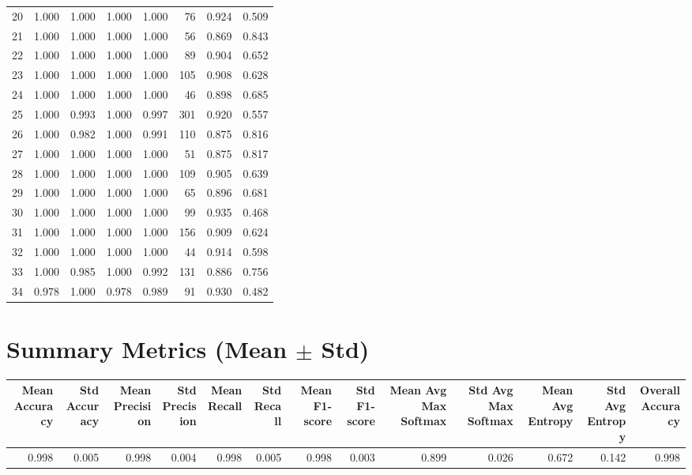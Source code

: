 \documentclass{article}
\begin{document}
\begin{tabular}{lrrrrrrr}
20 & 1.000 & 1.000 & 1.000 & 1.000 & 76 & 0.924 & 0.509 \\
21 & 1.000 & 1.000 & 1.000 & 1.000 & 56 & 0.869 & 0.843 \\
22 & 1.000 & 1.000 & 1.000 & 1.000 & 89 & 0.904 & 0.652 \\
23 & 1.000 & 1.000 & 1.000 & 1.000 & 105 & 0.908 & 0.628 \\
24 & 1.000 & 1.000 & 1.000 & 1.000 & 46 & 0.898 & 0.685 \\
25 & 1.000 & 0.993 & 1.000 & 0.997 & 301 & 0.920 & 0.557 \\
26 & 1.000 & 0.982 & 1.000 & 0.991 & 110 & 0.875 & 0.816 \\
27 & 1.000 & 1.000 & 1.000 & 1.000 & 51 & 0.875 & 0.817 \\
28 & 1.000 & 1.000 & 1.000 & 1.000 & 109 & 0.905 & 0.639 \\
29 & 1.000 & 1.000 & 1.000 & 1.000 & 65 & 0.896 & 0.681 \\
30 & 1.000 & 1.000 & 1.000 & 1.000 & 99 & 0.935 & 0.468 \\
31 & 1.000 & 1.000 & 1.000 & 1.000 & 156 & 0.909 & 0.624 \\
32 & 1.000 & 1.000 & 1.000 & 1.000 & 44 & 0.914 & 0.598 \\
33 & 1.000 & 0.985 & 1.000 & 0.992 & 131 & 0.886 & 0.756 \\
34 & 0.978 & 1.000 & 0.978 & 0.989 & 91 & 0.930 & 0.482 \\
\bottomrule
\end{tabular}
\section*{Summary Metrics (Mean $\pm$ Std)}
\begin{tabular}{rrrrrrrrrrrrr}
\toprule
Mean Accuracy & Std Accuracy & Mean Precision & Std Precision & Mean Recall & Std Recall & Mean F1-score & Std F1-score & Mean Avg Max Softmax & Std Avg Max Softmax & Mean Avg Entropy & Std Avg Entropy & Overall Accuracy \\
\midrule
0.998 & 0.005 & 0.998 & 0.004 & 0.998 & 0.005 & 0.998 & 0.003 & 0.899 & 0.026 & 0.672 & 0.142 & 0.998 \\
\bottomrule
\end{tabular}
\end{document}
